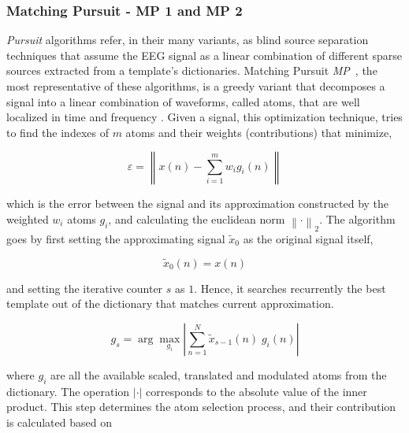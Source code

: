 \subsubsection{Matching Pursuit - MP 1 and MP 2}

\textit{Pursuit} algorithms refer, in their many variants, as blind source separation \cite{Vincent2010} techniques that assume the EEG signal as a linear combination of different sparse sources extracted from a template's dictionaries.  Matching Pursuit \textit{MP}~\cite{Mallat1993}, the most representative of these algorithms, is a greedy variant that decomposes a signal into a linear combination of waveforms, called atoms, that are well localized in time and frequency \cite{ChandranKS2016}.  Given a signal, this optimization technique, tries to find the indexes of $m$ atoms and their weights (contributions) that minimize,


\begin{equation}
\varepsilon =  \left\lVert   x(n) - \sum_{i=1}^{m} w_i g_{i}(n)   \right\rVert
\label{eq:mperror}
\end{equation}

\noindent which is the error between the signal and its approximation constructed by the weighted $w_i$ atoms $g_{i}$, and calculating the euclidean norm ${\left\lVert \cdot \right\rVert}_{2}$.  The algorithm goes by first setting the approximating signal $\tilde{x}_{0}$  as the original signal itself,  

\begin{equation}
\tilde{x}_{0}(n) = x(n)
\label{eq:mp2}
\end{equation}

\noindent and setting the iterative counter $s$ as $1$. Hence, it searches recurrently the best template out of the dictionary  that matches current approximation.  

\begin{equation}
g_{s} = \arg \max_{g_{i}} \left\lvert  \sum_{n=1}^{N} \tilde{x}_{s-1}(n) \; g_{i}(n) \right\rvert 
\label{eq:mp3}
\end{equation}

\noindent where $g_{i}$ are all the available scaled, translated and modulated atoms from the dictionary.  The operation $\left\lvert \cdot \right\rvert$ corresponds to the absolute value of the inner product.  This step determines the atom selection process, and their contribution is calculated based on 




